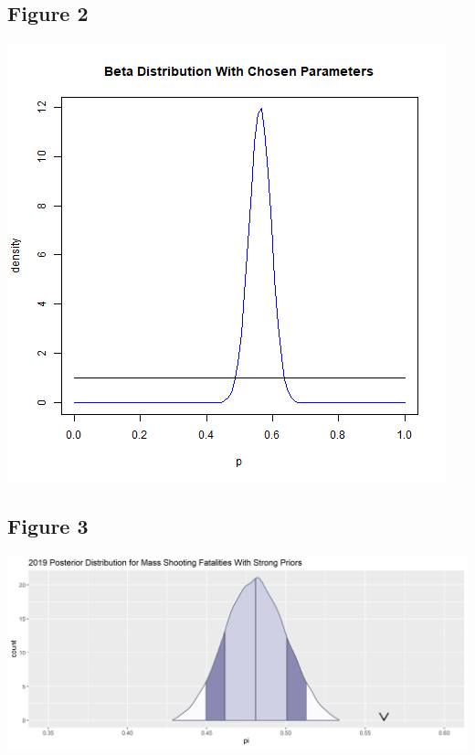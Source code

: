 \documentclass{article}
\begin{document}
\subsection{Figure 2}
\includegraphics[scale=.6]{Figure2.png}\label{Figure 2}

\subsection{Figure 3}
\includegraphics[scale=.5]{Figure3.png}\label{Figure 3}
\end{document}
